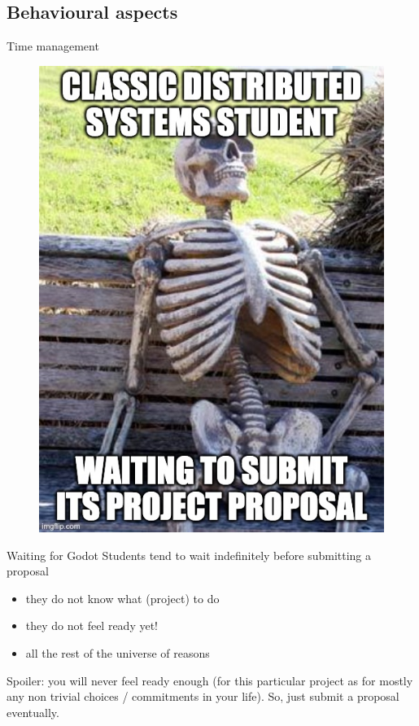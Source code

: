 \documentclass[presentation]{beamer}\mode<presentation>{\usetheme{AMSBolognaFC}}
\begin{document}
\subsection{Behavioural aspects}

\begin{frame}[c,allowframebreaks]{Time management}
    
    \begin{figure}
        \centering
        \includegraphics[height=0.8\textheight]{figures/waiting-meme}    
    \end{figure}
    
    
    \framebreak
    
    \begin{block}{Waiting for Godot}
        Students tend to wait indefinitely before submitting a proposal
        \begin{itemize}
            \item they do not know what (project) to do
            \item \alert{they do not feel ready yet!}
            \item all the rest of the universe of reasons
        \end{itemize}
    \end{block}
    Spoiler: you will never feel ready enough (for this particular project as for mostly any non trivial choices / commitments in your life).
    So, just submit a proposal eventually.
    
\end{frame}
    
\end{document}
